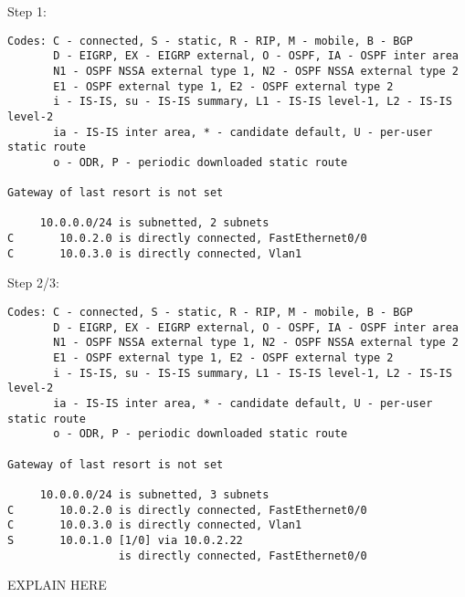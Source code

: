 Step 1:
\begin{verbatim}
Codes: C - connected, S - static, R - RIP, M - mobile, B - BGP
       D - EIGRP, EX - EIGRP external, O - OSPF, IA - OSPF inter area 
       N1 - OSPF NSSA external type 1, N2 - OSPF NSSA external type 2
       E1 - OSPF external type 1, E2 - OSPF external type 2
       i - IS-IS, su - IS-IS summary, L1 - IS-IS level-1, L2 - IS-IS level-2
       ia - IS-IS inter area, * - candidate default, U - per-user static route
       o - ODR, P - periodic downloaded static route

Gateway of last resort is not set

     10.0.0.0/24 is subnetted, 2 subnets
C       10.0.2.0 is directly connected, FastEthernet0/0
C       10.0.3.0 is directly connected, Vlan1
\end{verbatim}

Step 2/3:
\begin{verbatim}
Codes: C - connected, S - static, R - RIP, M - mobile, B - BGP
       D - EIGRP, EX - EIGRP external, O - OSPF, IA - OSPF inter area 
       N1 - OSPF NSSA external type 1, N2 - OSPF NSSA external type 2
       E1 - OSPF external type 1, E2 - OSPF external type 2
       i - IS-IS, su - IS-IS summary, L1 - IS-IS level-1, L2 - IS-IS level-2
       ia - IS-IS inter area, * - candidate default, U - per-user static route
       o - ODR, P - periodic downloaded static route

Gateway of last resort is not set

     10.0.0.0/24 is subnetted, 3 subnets
C       10.0.2.0 is directly connected, FastEthernet0/0
C       10.0.3.0 is directly connected, Vlan1
S       10.0.1.0 [1/0] via 10.0.2.22
                 is directly connected, FastEthernet0/0
\end{verbatim}

EXPLAIN HERE